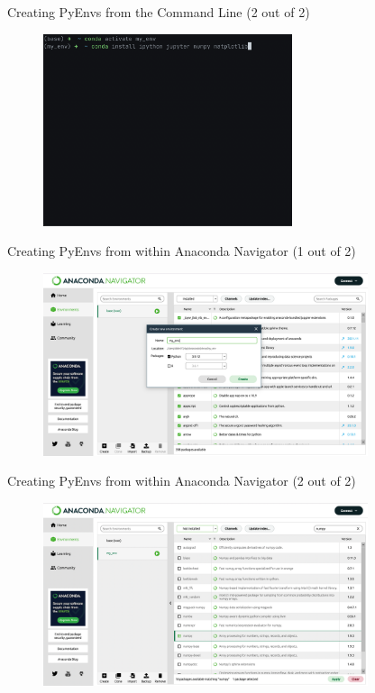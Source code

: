 \documentclass[aspectratio=1610]{beamer}
\begin{document}
\begin{frame}[c]{Creating PyEnvs from the Command Line (2 out of 2)}	
	\begin{figure}
		\includegraphics[width=0.65\textwidth]{images/conda_env_1}
	\end{figure}
\end{frame}

\begin{frame}[c]{Creating PyEnvs from within Anaconda Navigator (1 out of 2)}	
	\begin{figure}
		\includegraphics[width=0.85\textwidth]{images/anaconda_nav_env_0.png}
	\end{figure}
\end{frame}

\begin{frame}[c]{Creating PyEnvs from within Anaconda Navigator (2 out of 2)}	
	\begin{figure}
		\includegraphics[width=0.85\textwidth]{images/anaconda_nav_env_1.png}
	\end{figure}
\end{frame}
\end{document}

